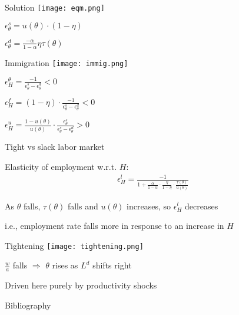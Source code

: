 \documentclass[aspectratio=169]{beamer}
\newenvironment{wideitemize}{\itemize\addtolength{\itemsep}{10pt}}{\enditemize}
\begin{document}
\begin{frame}{Solution}
    \centering
    \texttt{[image: eqm.png]}
    \begin{wideitemize}
        \item $\epsilon^s_\theta = u(\theta) \cdot (1 - \eta)$
        \item $\epsilon^d_\theta = \frac{-\alpha}{1-\alpha} \eta \tau(\theta)$
    \end{wideitemize}
\end{frame}

\begin{frame}{Immigration}
    \centering
    \texttt{[image: immig.png]}
    \begin{wideitemize}
        \item $\epsilon^\theta_H = \frac{-1}{\epsilon^s_\theta - \epsilon^d_\theta} < 0$
        \item $\epsilon^f_H = (1-\eta) \cdot \frac{-1}{\epsilon^s_\theta - \epsilon^d_\theta} < 0$
        \item $\epsilon^u_H = \frac{1 - u(\theta)}{u(\theta)} \cdot \frac{\epsilon^s_\theta}{\epsilon^s_\theta - \epsilon^d_\theta} > 0$
    \end{wideitemize}
\end{frame}

\begin{frame}{Tight vs slack labor market}
    \begin{wideitemize}
        \item Elasticity of employment w.r.t. $H$:
        \begin{align*}
            \epsilon^l_H = \frac{-1}{1 + \frac{\alpha}{1-\alpha} \cdot \frac{\eta}{1-\eta} \cdot \frac{\tau(\theta)}{u(\theta)}}
        \end{align*}
        \item As $\theta$ falls, $\tau(\theta)$ falls and $u(\theta)$ increases, so $\epsilon^l_H$ decreases
        \item i.e., employment rate falls more in response to an increase in $H$
    \end{wideitemize}
\end{frame}

\begin{frame}{Tightening}
    \centering
    \texttt{[image: tightening.png]}
    \begin{wideitemize}
        \item $\frac{w}{a}$ falls $\Rightarrow$ $\theta$ rises as $L^d$ shifts right
        \item Driven here purely by productivity shocks
    \end{wideitemize}
\end{frame}

\begin{frame}[allowframebreaks]{Bibliography}
    \printbibliography
\end{frame}
\end{document}
